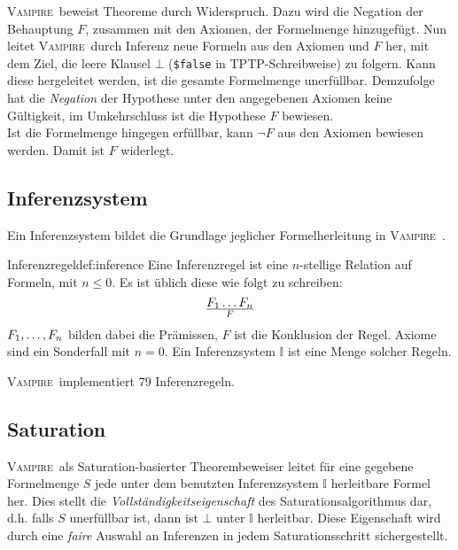 \documentclass{article}
\newcommand{\vampire}{\textsc{Vampire}~}
\begin{document}
\vampire beweist Theoreme durch Widerspruch.
Dazu wird die Negation der Behauptung $F$, zusammen mit den Axiomen,
der Formelmenge hinzugefügt.
Nun leitet \vampire durch Inferenz neue Formeln aus den Axiomen und $F$ her, 
mit dem Ziel, die leere Klausel $\bot$ (\texttt{\$false} in TPTP-Schreibweise) zu folgern.
Kann diese hergeleitet werden, ist die gesamte Formelmenge unerfüllbar.
Demzufolge hat die \textit{Negation} der Hypothese unter den angegebenen Axiomen keine Gültigkeit,
im Umkehrschluss ist die Hypothese $F$ bewiesen. \cite[S. 5]{cav2013}\\
Ist die Formelmenge hingegen erfüllbar, kann $\neg F$ aus den Axiomen bewiesen werden.
Damit ist $F$ widerlegt. \cite[S. 7]{cav2013}

\subsection{Inferenzsystem}
\label{subsec:inference}

Ein Inferenzsystem bildet die Grundlage jeglicher Formelherleitung in \vampire.

\begin{definition}{Inferenzregel}{def:inference}
	Eine Inferenzregel ist eine $n$-stellige Relation auf Formeln, mit $n \leq 0$.
	Es ist üblich diese wie folgt zu schreiben:
	\[F_1  \mathellipsis F_n \over F\]
	$F_1, \mathellipsis , F_n$ bilden dabei die Prämissen, $F$ ist die Konklusion der Regel.
	Axiome sind ein Sonderfall mit $n=0$. Ein Inferenzsystem $\mathds{I}$ ist eine Menge solcher
	Regeln.  \cite[S. 11]{cav2013}
\end{definition}

\vampire implementiert 79 Inferenzregeln. \cite[S. 6]{cav2013}

\subsection{Saturation}
\label{subsec:saturation}

\vampire als Saturation-basierter Theorembeweiser leitet für eine gegebene Formelmenge $S$
jede unter dem benutzten Inferenzsystem $\mathds{I}$ herleitbare Formel her. Dies stellt die
\emph{Vollständigkeitseigenschaft} des Saturationsalgorithmus dar, d.h. falls $S$ unerfüllbar ist,
dann ist $\bot$ unter $\mathds{I}$ herleitbar. Diese Eigenschaft wird durch eine \emph{faire}
Auswahl an Inferenzen in jedem Saturationsschritt sichergestellt. \cite[S. 12-13]{cav2013}
\end{document}
